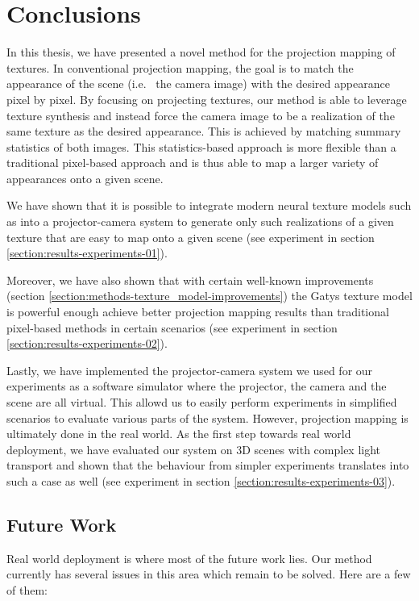 \chapter{Conclusions}
\label{chapter:conclusions}

In this thesis, we have presented a novel method for the projection mapping of textures. In conventional projection mapping, the goal is to match the appearance of the scene (i.e.~ the camera image) with the desired appearance pixel by pixel. By focusing on projecting textures, our method is able to leverage texture synthesis and instead force the camera image to be a realization of the same texture as the desired appearance. This is achieved by matching summary statistics of both images. This statistics-based approach is more flexible than a traditional pixel-based approach and is thus able to map a larger variety of appearances onto a given scene.

We have shown that it is possible to integrate modern neural texture models such as \citet{Gatys2015} into a projector-camera system to generate only such realizations of a given texture that are easy to map onto a given scene (see experiment in section \ref{section:results-experiments-01}).

Moreover, we have also shown that with certain well-known improvements (section \ref{section:methods-texture_model-improvements}) the Gatys texture model is powerful enough achieve better projection mapping results than traditional pixel-based methods in certain scenarios (see experiment in section \ref{section:results-experiments-02}).

Lastly, we have implemented the projector-camera system we used for our experiments as a software simulator where the projector, the camera and the scene are all virtual. This allowd us to easily perform experiments in simplified scenarios to evaluate various parts of the system. However, projection mapping is ultimately done in the real world. As the first step towards real world deployment, we have evaluated our system on 3D scenes with complex light transport and shown that the behaviour from simpler experiments translates into such a case as well (see experiment in section \ref{section:results-experiments-03}).

\section{Future Work}
\label{section:conclusions-future_work}

Real world deployment is where most of the future work lies. Our method currently has several issues in this area which remain to be solved. Here are a few of them:

